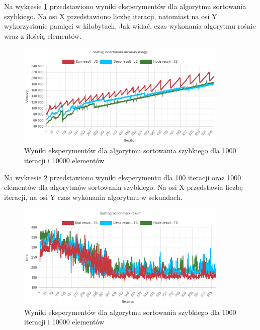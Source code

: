 Na wykresie \ref{fig:quick_sorting_e6_memory_js} przedstawiono wyniki eksperymentów dla algorytmu sortowania szybkiego. Na osi X przedstawiono liczbę iteracji, natomiast na osi Y wykorzystanie pamięci w kilobytach. Jak widać, czas wykonania algorytmu rośnie wraz z ilością elementów.
\begin{figure}[H]
  \centering
  \includegraphics[width=0.9\textwidth]{Figures/sorting/quick/e6_memory_js.png}
  \caption{Wyniki eksperymentów dla algorytmu sortowania szybkiego dla 1000 iteracji i 10000 elementów}
  \label{fig:quick_sorting_e6_memory_js}
\end{figure}

Na wykresie \ref{fig:quick_sorting_e6_ts} przedstawiono wyniki eksperymentu dla 100 iteracji oraz 1000 elementów dla algorytmów sortowania szybkiego. Na osi X przedstawia liczbę iteracji, na osi Y czas wykonania algorytmu w sekundach. 

\begin{figure}[H]
  \centering
  \includegraphics[width=0.9\textwidth]{Figures/sorting/quick/e6_ts.png}
  \caption{Wyniki eksperymentów dla algorytmu sortowania szybkiego dla 1000 iteracji i 10000 elementów}
  \label{fig:quick_sorting_e6_ts}
\end{figure}


